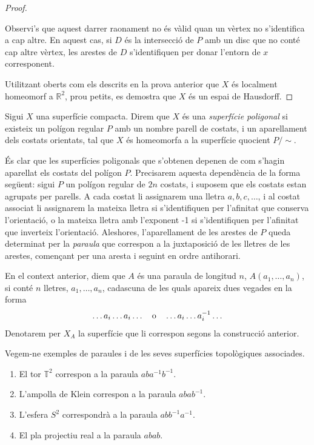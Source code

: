 \documentclass[../main.tex]{subfiles}
\begin{document}
\begin{proof}
\begin{enumerate}
    Observi's que aquest darrer raonament no és vàlid quan un vèrtex no s'identifica a cap altre. En aquest cas, si $D$ és la intersecció de $P$ amb un disc que no conté cap altre vèrtex, les arestes de $D$ s'identifiquen per donar l'entorn de $x$ corresponent.
\end{enumerate}

Utilitzant oberts com els descrits en la prova anterior que $X$ és localment homeomorf a $\mathbb{R}^2$, prou petits, es demostra que $X$ és un espai de Hausdorff.
\end{proof}

\begin{defi}
\label{def:superficiepoligonal} Sigui $X$ una superfície compacta. Direm que $X$ és una \textit{superfície poligonal} si existeix un polígon regular $P$ amb un nombre parell de costats, i un aparellament dels costats orientats, tal que $X$ és homeomorfa a la superfície quocient $P/\sim$.
\end{defi}

És clar que les superfícies poligonals que s'obtenen depenen de com s'hagin aparellat els costats del polígon $P$. Precisarem aquesta dependència de la forma següent: sigui $P$ un polígon regular de $2n$ costats, i suposem que els costats estan agrupats per parells. A cada costat li assignarem una lletra $a,b,c,\ldots$, i al costat associat li assignarem la mateixa lletra si s'identifiquen per l'afinitat que conserva l'orientació, o la mateixa lletra amb l'exponent -1 si s'identifiquen per l'afinitat que inverteix l'orientació. Aleshores, l'aparellament de les arestes de $P$ queda determinat per la \textit{paraula} que correspon a la juxtaposició de les lletres de les arestes, començant per una aresta i seguint en ordre antihorari.

\begin{defi}
[Paraula]\label{def:paraula} En el context anterior, diem que $A$ és una paraula de longitud $n$, $A(a_1,\ldots,a_n)$, si conté $n$ lletres, $a_1,\ldots,a_n$, cadascuna de les quals apareix dues vegades en la forma
\begin{equation}
    \notag
    \ldots a_i\ldots a_i\ldots \quad \text{o}\quad \ldots a_i\ldots a_i^{-1}\ldots 
\end{equation}
Denotarem per $X_A$ la superfície que li correspon segons la construcció anterior.
\end{defi}

\begin{ej}
Vegem-ne exemples de paraules i de les seves superfícies topològiques associades.
\begin{enumerate}[(1)]
    \item El tor $\mathbb{T}^2$ correspon a la paraula $aba^{-1}b^{-1}$.
    \item L'ampolla de Klein correspon a la paraula $abab^{-1}$.
    \item L'esfera $S^2$ correspondrà a la paraula $abb^{-1}a^{-1}$.
    \item El pla projectiu real a la paraula $abab$.
\end{enumerate}
\end{ej}
\end{document}
